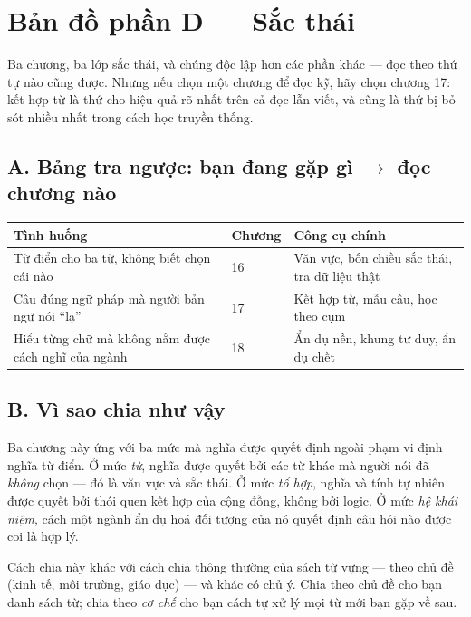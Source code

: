 \documentclass[../english.tex]{subfiles}
\begin{document}
\section*{Bản đồ phần D --- Sắc thái}

\begin{tomtat}
Ba chương, ba lớp sắc thái, và chúng độc lập hơn các phần khác --- đọc theo thứ tự nào cũng được. Nhưng nếu chọn một chương để đọc kỹ, hãy chọn chương 17: kết hợp từ là thứ cho hiệu quả rõ nhất trên cả đọc lẫn viết, và cũng là thứ bị bỏ sót nhiều nhất trong cách học truyền thống.
\end{tomtat}

\subsection*{A. Bảng tra ngược: bạn đang gặp gì \(\rightarrow\) đọc chương nào}
\begin{center}\footnotesize
\begin{tabularx}{\linewidth}{@{}L{5.6cm}L{2.0cm}Y@{}}
\toprule
\textbf{Tình huống} & \textbf{Chương} & \textbf{Công cụ chính}\\
\midrule
Từ điển cho ba từ, không biết chọn cái nào & 16 & Văn vực, bốn chiều sắc thái, tra dữ liệu thật\\
Câu đúng ngữ pháp mà người bản ngữ nói ``lạ'' & 17 & Kết hợp từ, mẫu câu, học theo cụm\\
Hiểu từng chữ mà không nắm được cách nghĩ của ngành & 18 & Ẩn dụ nền, khung tư duy, ẩn dụ chết\\
\bottomrule
\end{tabularx}
\end{center}

\subsection*{B. Vì sao chia như vậy}
Ba chương này ứng với ba mức mà nghĩa được quyết định ngoài phạm vi định nghĩa từ điển. Ở mức \emph{từ}, nghĩa được quyết bởi các từ khác mà người nói đã \emph{không} chọn --- đó là văn vực và sắc thái. Ở mức \emph{tổ hợp}, nghĩa và tính tự nhiên được quyết bởi thói quen kết hợp của cộng đồng, không bởi logic. Ở mức \emph{hệ khái niệm}, cách một ngành ẩn dụ hoá đối tượng của nó quyết định câu hỏi nào được coi là hợp lý.

Cách chia này khác với cách chia thông thường của sách từ vựng --- theo chủ đề (kinh tế, môi trường, giáo dục) --- và khác có chủ ý. Chia theo chủ đề cho bạn danh sách từ; chia theo \emph{cơ chế} cho bạn cách tự xử lý mọi từ mới bạn gặp về sau.
\end{document}
